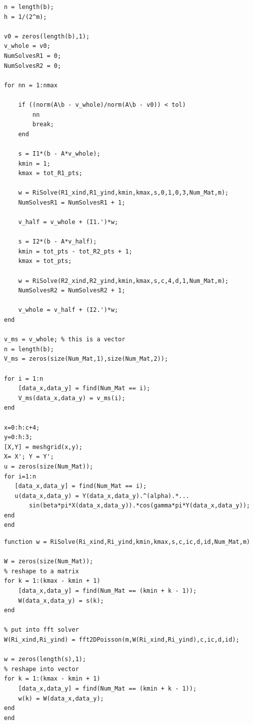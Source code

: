 \documentclass[12pt]{article}
\begin{document}
\begin{itemize}
\begin{lstlisting}[caption=Multiplicative Schwarz Function]
n = length(b);
h = 1/(2^m);

v0 = zeros(length(b),1);
v_whole = v0;
NumSolvesR1 = 0;
NumSolvesR2 = 0;

for nn = 1:nmax
    
    if ((norm(A\b - v_whole)/norm(A\b - v0)) < tol)
        nn
        break;
    end
    
    s = I1*(b - A*v_whole);
    kmin = 1;
    kmax = tot_R1_pts;
    
    w = RiSolve(R1_xind,R1_yind,kmin,kmax,s,0,1,0,3,Num_Mat,m);
    NumSolvesR1 = NumSolvesR1 + 1;
    
    v_half = v_whole + (I1.')*w;
    
    s = I2*(b - A*v_half);
    kmin = tot_pts - tot_R2_pts + 1;
    kmax = tot_pts;
    
    w = RiSolve(R2_xind,R2_yind,kmin,kmax,s,c,4,d,1,Num_Mat,m);
    NumSolvesR2 = NumSolvesR2 + 1;
    
    v_whole = v_half + (I2.')*w;
end

v_ms = v_whole; % this is a vector
n = length(b);
V_ms = zeros(size(Num_Mat,1),size(Num_Mat,2));

for i = 1:n
    [data_x,data_y] = find(Num_Mat == i);
    V_ms(data_x,data_y) = v_ms(i); 
end
    
x=0:h:c+4;
y=0:h:3;
[X,Y] = meshgrid(x,y);
X= X'; Y = Y';
u = zeros(size(Num_Mat));
for i=1:n
   [data_x,data_y] = find(Num_Mat == i);
   u(data_x,data_y) = Y(data_x,data_y).^(alpha).*...
       sin(beta*pi*X(data_x,data_y)).*cos(gamma*pi*Y(data_x,data_y));
end
end
\end{lstlisting}

\lstset{language=matlab,frame=single}
\begin{lstlisting}[caption=Fast Elliptic Solver on $R_i$]
function w = RiSolve(Ri_xind,Ri_yind,kmin,kmax,s,c,ic,d,id,Num_Mat,m)

W = zeros(size(Num_Mat));
% reshape to a matrix
for k = 1:(kmax - kmin + 1)
    [data_x,data_y] = find(Num_Mat == (kmin + k - 1));
    W(data_x,data_y) = s(k);
end

% put into fft solver
W(Ri_xind,Ri_yind) = fft2DPoisson(m,W(Ri_xind,Ri_yind),c,ic,d,id);

w = zeros(length(s),1);
% reshape into vector
for k = 1:(kmax - kmin + 1)
    [data_x,data_y] = find(Num_Mat == (kmin + k - 1));
    w(k) = W(data_x,data_y);
end
end
\end{lstlisting} \text{ }\\



\end{itemize}
\end{document}
